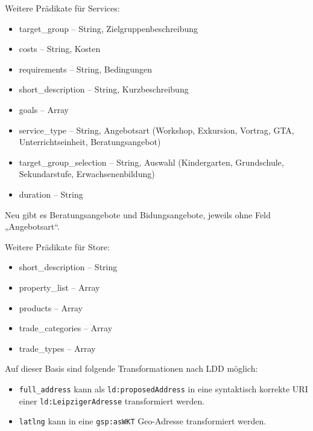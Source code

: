 \documentclass[a4paper,11pt]{article}
\begin{document}
Weitere Prädikate für Services:
\begin{itemize}\itemsep0pt
  \item target\_group -- String, Zielgruppenbeschreibung
  \item costs -- String, Kosten
  \item requirements -- String, Bedingungen
  \item short\_description -- String, Kurzbeschreibung
  \item goals -- Array
  \item service\_type -- String, Angebotsart (Workshop, Exkursion, Vortrag,
    GTA, Unterrichtseinheit, Beratungsangebot)
  \item target\_group\_selection -- String, Auswahl (Kindergarten,
    Grundschule, Sekundarstufe, Erwachsenenbildung)
  \item duration -- String
\end{itemize}
Neu gibt es Beratungsangebote und Bidungsangebote, jeweils ohne Feld
„Angebotsart“.

Weitere Prädikate für Store:
\begin{itemize}\itemsep0pt
  \item short\_description -- String
  \item property\_list -- Array
  \item products -- Array
  \item trade\_categories -- Array
  \item trade\_types -- Array
\end{itemize}

Auf dieser Basis sind folgende Transformationen nach LDD möglich:
\begin{itemize}\raggedright
\item \texttt{full\_address} kann als \texttt{ld:proposedAddress} in eine
  syntaktisch korrekte URI einer \texttt{ld:LeipzigerAdresse} transformiert
  werden. 
\item \texttt{latlng} kann in eine \texttt{gsp:asWKT} Geo-Adresse
  transformiert werden.
\end{itemize}
\end{document}
